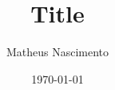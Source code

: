 \documentclass{memoir}
\begin{document}
\title{Title}
\author{Matheus Nascimento}
\date{\today}
\maketitle
\pagebreak

\begingroup
\let\clearpage\relax 					





\endgroup



\end{document}
